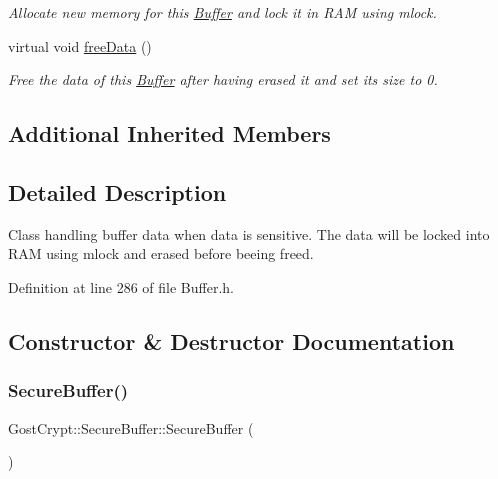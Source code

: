 \begin{DoxyCompactItemize}
\begin{DoxyCompactList}\small\item\em Allocate new memory for this \hyperlink{class_gost_crypt_1_1_buffer}{Buffer} and lock it in R\+AM using mlock. \end{DoxyCompactList}\item 
virtual void \hyperlink{class_gost_crypt_1_1_secure_buffer_a45e814bc17ed85b86733fffc32c69d28}{free\+Data} ()
\begin{DoxyCompactList}\small\item\em Free the data of this \hyperlink{class_gost_crypt_1_1_buffer}{Buffer} after having erased it and set its size to 0. \end{DoxyCompactList}\end{DoxyCompactItemize}
\subsection*{Additional Inherited Members}


\subsection{Detailed Description}
Class handling buffer data when data is sensitive. The data will be locked into R\+AM using mlock and erased before beeing freed. 

Definition at line 286 of file Buffer.\+h.



\subsection{Constructor \& Destructor Documentation}
\mbox{\label{class_gost_crypt_1_1_secure_buffer_a46bb20b44902e5722a7175e806e1b237}} 
\subsubsection{\texorpdfstring{Secure\+Buffer()}{SecureBuffer()}\hspace{0.1cm}{\footnotesize\ttfamily [1/3]}}
{\footnotesize\ttfamily Gost\+Crypt\+::\+Secure\+Buffer\+::\+Secure\+Buffer (\begin{DoxyParamCaption}{ }\end{DoxyParamCaption})\hspace{0.3cm}{\ttfamily [inline]}}



